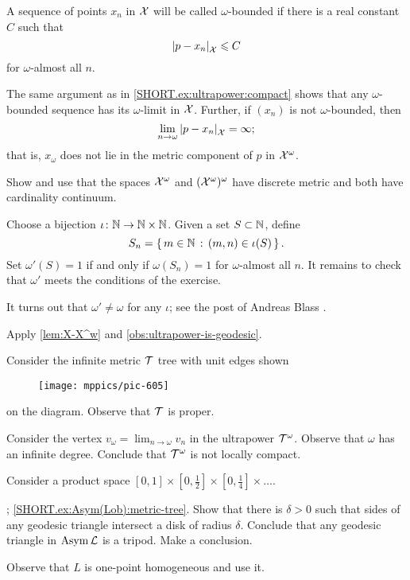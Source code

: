 A sequence of points $x_n$ in $\mathcal{X}$ will be called $\omega$-bounded if there is a real constant $C$ such that
\[\dist{p}{x_n}{\spc{X}}\le C\] 
for $\omega$-almost all $n$.

The same argument as in \ref{SHORT.ex:ultrapower:compact} shows that any $\omega$-bounded sequence has its $\omega$-limit in $\mathcal{X}$.
Further, if $(x_n)$ is not  $\omega$-bounded, then 
\[\lim_{n\to\omega}\dist{p}{x_n}{\spc{X}}=\infty;\]
that is, $x_\omega$ does not lie in the metric component of $p$ in $\mathcal{X}^\omega$.

 Show and use that the spaces $\mathcal{X}^\omega$ and $(\mathcal{X}^\omega)^\omega$ have discrete metric and both have cardinality continuum.

Choose a bijection $\iota\colon\mathbb{N}\to \mathbb{N}\times \mathbb{N}$.
Given a set $S\subset \mathbb{N}$, define
\[S_n=\left\{\,{m\in\mathbb{N}}\,:\,{(m,n)\in \iota(S)}\,\right\}.\]
Set $\omega'(S)=1$ if and only if $\omega(S_n)=1$ for $\omega$-almost all $n$.
It remains to check that $\omega'$ meets the conditions of the exercise.

It turns out that $\omega'\ne \omega$ for any $\iota$;
see the post of Andreas Blass \cite{blass}.

Apply \ref{lem:X-X^w} and \ref{obs:ultrapower-is-geodesic}.

 Consider the infinite metric $\mathcal{T}$ tree with unit edges shown
\begin{figure}[ht!]
\vskip-0mm
\centering
\texttt{[image: mppics/pic-605]}
\end{figure}
on the diagram. Observe that $\mathcal{T}$ is proper.

Consider the vertex $v_\omega=\lim_{n\to\omega}v_n$ in the ultrapower $\mathcal{T}^\omega$.
Observe that $\omega$ has an infinite degree.
Conclude that $\mathcal{T}^\omega$ is not locally compact.

 Consider a product space $[0,1]\times[0,\tfrac12]\times[0,\tfrac14]\times\dots$.

\parbf{\ref{ex:Asym(Lob)}}; \ref{SHORT.ex:Asym(Lob):metric-tree}.
Show that there is $\delta>0$ such that sides of any geodesic triangle intersect a disk of radius $\delta$.
Conclude that any geodesic triangle in $\mathop{\rm Asym}\nolimits\mathcal{L}$ is a tripod.
Make a conclusion.

 Observe that $L$ is one-point homogeneous and use it.


